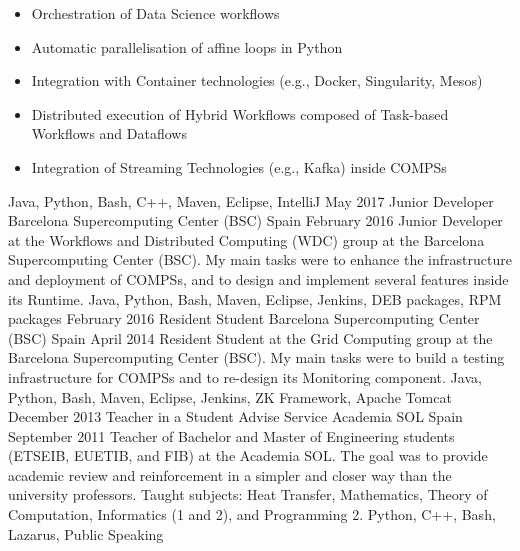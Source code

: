\begin{experiences}
{        \begin{itemize}
            \item Orchestration of Data Science workflows
            \item Automatic parallelisation of affine loops in Python
            \item Integration with Container technologies (e.g., Docker, Singularity, Mesos)
            \item Distributed execution of Hybrid Workflows composed of Task-based Workflows and Dataflows
            \item Integration of Streaming Technologies (e.g., Kafka) inside COMPSs
        \end{itemize}
        }
        {Java, Python, Bash, C++, Maven, Eclipse, IntelliJ}
    \emptySeparator
    \experience
        {May 2017}
        {Junior Developer}
        {Barcelona Supercomputing Center (BSC)}
        {Spain}
        {February 2016}
        {Junior Developer at the Workflows and Distributed Computing (WDC) group at the Barcelona Supercomputing Center (BSC). My main tasks were to enhance the infrastructure and deployment of COMPSs, and to design and implement several features inside its Runtime.
        }
        {Java, Python, Bash, Maven, Eclipse, Jenkins, DEB packages, RPM packages}
    \emptySeparator
    \experience
        {February 2016}
        {Resident Student}
        {Barcelona Supercomputing Center (BSC)}
        {Spain}
        {April 2014}
        {Resident Student at the Grid Computing group at the Barcelona Supercomputing Center (BSC). My main tasks were to build a testing infrastructure for COMPSs and to re-design its Monitoring component.
        }
        {Java, Python, Bash, Maven, Eclipse, Jenkins, ZK Framework, Apache Tomcat}
    \emptySeparator
    \experience
        {December 2013}
        {Teacher in a Student Advise Service}
        {Academia SOL}
        {Spain}
        {September 2011}
        {Teacher of Bachelor and Master of Engineering students (ETSEIB, EUETIB, and FIB) at the Academia SOL. The goal was to provide academic review and reinforcement in a simpler and closer way than the university professors. Taught subjects: Heat Transfer, Mathematics, Theory of Computation, Informatics (1 and 2), and Programming 2.
        }
        {Python, C++, Bash, Lazarus, Public Speaking}

\end{experiences}
